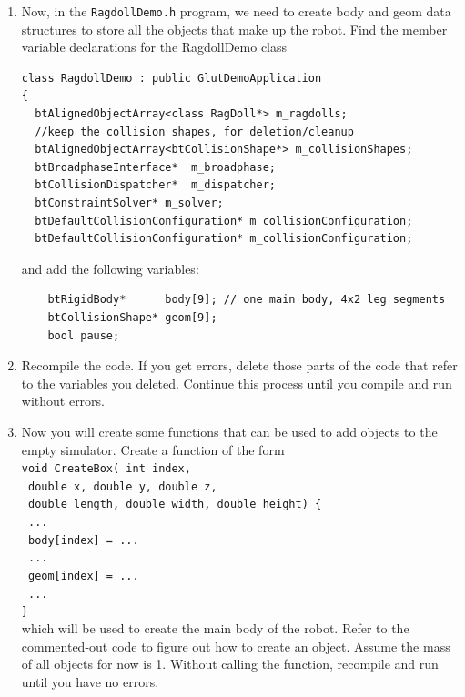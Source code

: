 \documentclass[12pt]{article}
\begin{document}
\begin{enumerate}
\item Now, in the \texttt{RagdollDemo.h} program, we need to create
  body and geom data structures to store all the objects that make up
  the robot. Find the member variable declarations for the RagdollDemo class

\begin{verbatim}
class RagdollDemo : public GlutDemoApplication
{
  btAlignedObjectArray<class RagDoll*> m_ragdolls;
  //keep the collision shapes, for deletion/cleanup
  btAlignedObjectArray<btCollisionShape*> m_collisionShapes;
  btBroadphaseInterface*  m_broadphase;
  btCollisionDispatcher*  m_dispatcher;
  btConstraintSolver* m_solver;
  btDefaultCollisionConfiguration* m_collisionConfiguration;
  btDefaultCollisionConfiguration* m_collisionConfiguration;
\end{verbatim}

and add the following variables:

\begin{verbatim}
    btRigidBody*      body[9]; // one main body, 4x2 leg segments
    btCollisionShape* geom[9];
    bool pause;
\end{verbatim}

\item Recompile the code. If you get errors, delete those parts of the code that refer to the variables you deleted. Continue this process until you compile and run without errors.

\item Now you will create some functions that can be used to add objects to the empty simulator. Create a function of the form \\
\texttt{void CreateBox( int index,}\\
\texttt{        double x, double y, double z,}\\
\texttt{        double length, double width, double height) \{}\\
\texttt{  ...}\\
\texttt{  body[index] = ...}\\
\texttt{  ...}\\
\texttt{  geom[index] = ...}\\
\texttt{  ...}\\
\texttt{\}} \\
which will be used to create the main body of the robot. Refer to the commented-out code to figure out how to create an object. Assume the mass of all objects for now is 1. Without calling the function, recompile and run until you have no errors.


\end{enumerate}
\end{document}
